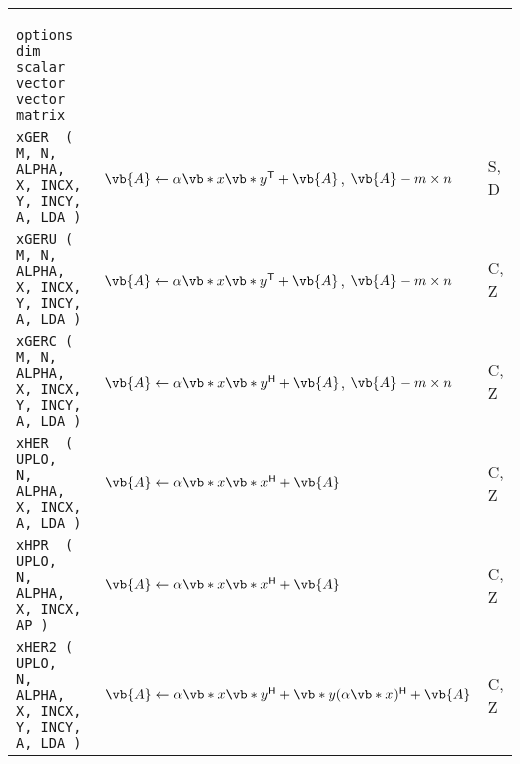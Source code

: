 \documentclass[10pt,a3paper, landscape]{article}
\newcommand{\T}{\mathsf{T}}
\renewcommand{\H}{\mathsf{H}}
\begin{document}
\begin{tabular}{ll>{\ttfamily}l}
		\verb|        options            dim   scalar vector   vector   matrix                         | &                                                                                                                                                                                                                                                              &                    \\
		\verb|xGER  (                    M, N, ALPHA, X, INCX, Y, INCY, A, LDA )                       | & $\vb{A} \gets \alpha \vb*{x}\vb*{y}^{\T} + \vb{A}$, $\vb{A} - m \times n$                                                                                                                                                                                    & S, D               \\
		\verb|xGERU (                    M, N, ALPHA, X, INCX, Y, INCY, A, LDA )                       | & $\vb{A} \gets \alpha \vb*{x}\vb*{y}^{\T} + \vb{A}$, $\vb{A} - m \times n$                                                                                                                                                                                    & C, Z               \\
		\verb|xGERC (                    M, N, ALPHA, X, INCX, Y, INCY, A, LDA )                       | & $\vb{A} \gets \alpha \vb*{x}\vb*{y}^{\H} + \vb{A}$, $\vb{A} - m \times n$                                                                                                                                                                                    & C, Z               \\
		\verb|xHER  ( UPLO,                 N, ALPHA, X, INCX,          A, LDA )                       | & $\vb{A} \gets \alpha \vb*{x}\vb*{x}^{\H} + \vb{A}$                                                                                                                                                                                                           & C, Z               \\
		\verb|xHPR  ( UPLO,                 N, ALPHA, X, INCX,          AP )                           | & $\vb{A} \gets \alpha \vb*{x}\vb*{x}^{\H} + \vb{A}$                                                                                                                                                                                                           & C, Z               \\
		\verb|xHER2 ( UPLO,                 N, ALPHA, X, INCX, Y, INCY, A, LDA )                       | & $\vb{A} \gets \alpha \vb*{x}\vb*{y}^{\H} + \vb*{y}(\alpha \vb*{x})^{\H} + \vb{A}$                                                                                                                                                                            & C, Z               \\

\end{tabular}
\end{document}
